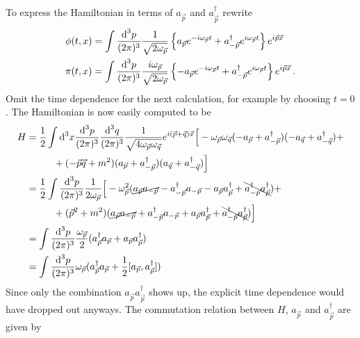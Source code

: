 To express the Hamiltonian in terms of $a_{\vec{p}}$ and $a_{\vec{p}}^\dagger$ rewrite
\begin{subequations}
    \begin{align}
        \phi(t,x)               & =\int\frac{\text{d} ^3p}{(2\pi)^3}\frac{1}{\sqrt{2\omega_{\vec{p}}}}\left\{a_{\vec{p}}e^{-{i}\omega_{\vec{p}}t}+a_{-\vec{p}}^\dagger e^{{i}\omega_{\vec{p}}t}\right\}e^{{i}\vec{p}\vec{x}}                                             \\
        \pi(t,x) & =\int\frac{\text{d} ^3p}{(2\pi)^3}\frac{{i}\omega_{\vec{p}}}{\sqrt{2\omega_{\vec{p}}}}\left\{-a_{\vec{p}}e^{-{i}\omega_{\vec{p}}t}+a_{-\vec{p}}^\dagger e^{{i}\omega_{\vec{p}}t}\right\}e^{{i}\vec{p}\vec{x}}\,.
    \end{align}
\end{subequations}
Omit the time dependence for the next calculation, for example by choosing $t=0$. The Hamiltonian is now easily computed to be
\begin{subequations}
    \begin{align}
        H&=\frac{1}{2}\int\text{d}^3x\frac{\text{d}^3p}{(2\pi)^3}\frac{\text{d}^3q}{(2\pi)^3}\frac{1}{\sqrt{4\omega_{\vec{p}}\omega_{\vec{q}}}}e^{{i}(\vec{p}+\vec{q})\vec{x}}\Big[-\omega_{\vec{p}}\omega_{\vec{q}}(-a_{\vec{p}}+a_{-\vec{p}}^\dagger)(-a_{\vec{q}}+a_{-\vec{q}}^\dagger)+\nonumber\\
        &\phantom{=}\qquad+(-\vec{p}\vec{q}+m^2)(a_{\vec{p}}+a_{-\vec{p}}^\dagger)(a_{\vec{q}}+a_{-\vec{q}}^\dagger)\Big]\\
        &=\frac{1}{2}\int\frac{\text{d}^3p}{(2\pi)^3}\frac{1}{2\omega_{\vec{p}}}\Big[-\omega_{\vec{p}}^2(\cancel{a_{\vec{p}}a_{-\vec{p}}}-a_{-\vec{p}}^\dagger a_{-\vec{p}}-a_{\vec{p}}a_{\vec{p}}^\dagger+\bcancel{a_{-\vec{p}}^\dagger a_{\vec{p}}^\dagger})+\nonumber\\
        &\phantom{=}\qquad+(\vec{p}^2+m^2)(\cancel{a_{\vec{p}}a_{-\vec{p}}}+a_{-\vec{p}}^\dagger a_{-\vec{p}}+a_{\vec{p}}a_{\vec{p}}^\dagger+\bcancel{a_{-\vec{p}}^\dagger a_{\vec{p}}^\dagger})\Big]\\
        &=\int\frac{\text{d}^3p}{(2\pi)^3}\frac{\omega_{\vec{p}}}{2}(a_{\vec{p}}^\dagger a_{\vec{p}}+a_{\vec{p}}a_{\vec{p}}^\dagger)\\
        &=\int\frac{\text{d}^3p}{(2\pi)^3}\omega_{\vec{p}}(a_{\vec{p}}^\dagger a_{\vec{p}}+\frac{1}{2}[a_{\vec{p}},a_{\vec{p}}^\dagger])
    \end{align}
\end{subequations}
Since only the combination $a_{\vec{p}}a_{\vec{p}}^\dagger$ shows up, the explicit time dependence would have dropped out anyways. The commutation relation between $H$, $a_{\vec{p}}$ and $a_{\vec{p}}^\dagger$ are given by
